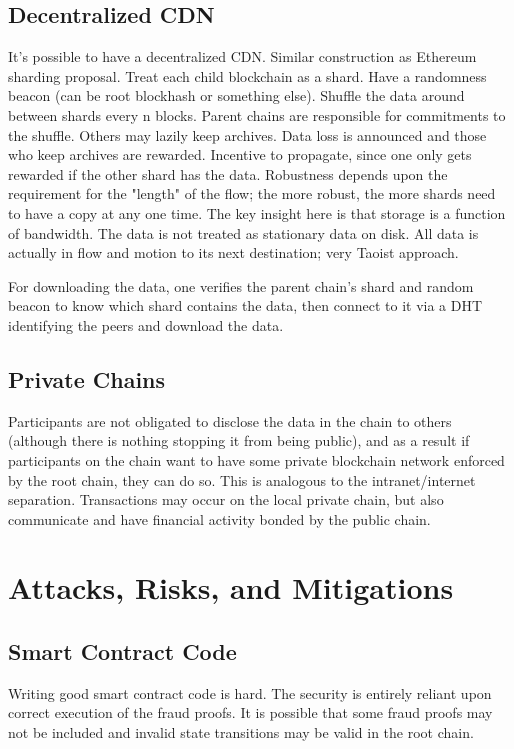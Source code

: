 \documentclass[letterpaper, 11pt]{article}
\begin{document}
\subsection{Decentralized CDN}

It's possible to have a decentralized CDN. Similar construction as Ethereum
sharding proposal. Treat each child blockchain as a shard. Have a randomness
beacon (can be root blockhash or something else). Shuffle the data around
between shards every n blocks. Parent chains are responsible for commitments to
the shuffle. Others may lazily keep archives. Data loss is announced and those
who keep archives are rewarded. Incentive to propagate, since one only gets
rewarded if the other shard has the data. Robustness depends upon the
requirement for the "length" of the flow; the more robust, the more shards need
to have a copy at any one time. The key insight here is that storage is a
function of bandwidth. The data is not treated as stationary data on disk. All
data is actually in flow and motion to its next destination; very Taoist
approach.

For downloading the data, one verifies the parent chain's shard and random
beacon to know which shard contains the data, then connect to it via a DHT
identifying the peers and download the data.

\subsection{Private Chains}

Participants are not obligated to disclose the data in the chain to others
(although there is nothing stopping it from being public), and as a result if
participants on the chain want to have some private blockchain network enforced
by the root chain, they can do so. This is analogous to the intranet/internet
separation. Transactions may occur on the local private chain, but also
communicate and have financial activity bonded by the public chain.

\section{Attacks, Risks, and Mitigations}

\subsection{Smart Contract Code}

Writing good smart contract code is hard. The security is entirely reliant upon
correct execution of the fraud proofs. It is possible that some fraud proofs
may not be included and invalid state transitions may be valid in the root
chain.
\end{document}
